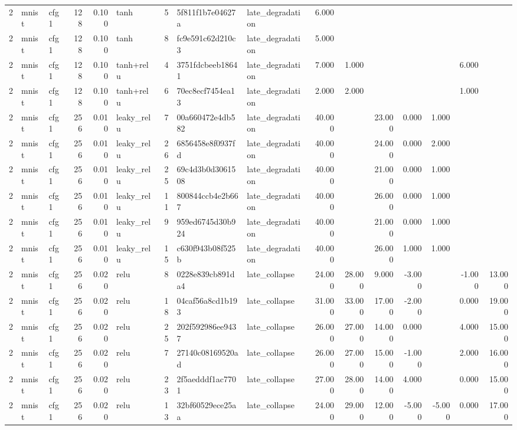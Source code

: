 \begin{table}[htbp]
{\begin{tabular}{@{}rllrrlrllrrrrrrr@{}}
2 & mnist & cfg1 & 128 & 0.100 & tanh & 5 & 5f811f1b7e04627a & late\_degradation & 6.000 &  &  &  &  &  &  \\
2 & mnist & cfg1 & 128 & 0.100 & tanh & 8 & fc9e591c62d210c3 & late\_degradation & 5.000 &  &  &  &  &  &  \\
2 & mnist & cfg1 & 128 & 0.100 & tanh+relu & 4 & 3751fdcbeeb18641 & late\_degradation & 7.000 & 1.000 &  &  &  & 6.000 &  \\
2 & mnist & cfg1 & 128 & 0.100 & tanh+relu & 6 & 70ec8ecf7454ea13 & late\_degradation & 2.000 & 2.000 &  &  &  & 1.000 &  \\
2 & mnist & cfg1 & 256 & 0.010 & leaky\_relu & 7 & 00a660472e4db582 & late\_degradation & 40.000 &  & 23.000 & 0.000 & 1.000 &  &  \\
2 & mnist & cfg1 & 256 & 0.010 & leaky\_relu & 26 & 6856458e8f0937fd & late\_degradation & 40.000 &  & 24.000 & 0.000 & 2.000 &  &  \\
2 & mnist & cfg1 & 256 & 0.010 & leaky\_relu & 25 & 69c4d3b0d3061508 & late\_degradation & 40.000 &  & 21.000 & 0.000 & 1.000 &  &  \\
2 & mnist & cfg1 & 256 & 0.010 & leaky\_relu & 11 & 800844ccb4e2b667 & late\_degradation & 40.000 &  & 26.000 & 0.000 & 1.000 &  &  \\
2 & mnist & cfg1 & 256 & 0.010 & leaky\_relu & 9 & 959ed6745d30b924 & late\_degradation & 40.000 &  & 21.000 & 0.000 & 1.000 &  &  \\
2 & mnist & cfg1 & 256 & 0.010 & leaky\_relu & 15 & c630f943b08f525b & late\_degradation & 40.000 &  & 26.000 & 1.000 & 1.000 &  &  \\
2 & mnist & cfg1 & 256 & 0.020 & relu & 8 & 0228e839cb891da4 & late\_collapse & 24.000 & 28.000 & 9.000 & -3.000 &  & -1.000 & 13.000 \\
2 & mnist & cfg1 & 256 & 0.020 & relu & 18 & 04caf56a8cd1b193 & late\_collapse & 31.000 & 33.000 & 17.000 & -2.000 &  & 0.000 & 19.000 \\
2 & mnist & cfg1 & 256 & 0.020 & relu & 25 & 202f592986ee9437 & late\_collapse & 26.000 & 27.000 & 14.000 & 0.000 &  & 4.000 & 15.000 \\
2 & mnist & cfg1 & 256 & 0.020 & relu & 7 & 27140c08169520ad & late\_collapse & 26.000 & 27.000 & 15.000 & -1.000 &  & 2.000 & 16.000 \\
2 & mnist & cfg1 & 256 & 0.020 & relu & 23 & 2f5aedddf1ac7701 & late\_collapse & 27.000 & 28.000 & 14.000 & 4.000 &  & 0.000 & 15.000 \\
2 & mnist & cfg1 & 256 & 0.020 & relu & 13 & 32bf60529ece25aa & late\_collapse & 24.000 & 29.000 & 12.000 & -5.000 & -5.000 & 0.000 & 17.000 \\

\end{tabular}}
\end{table}

